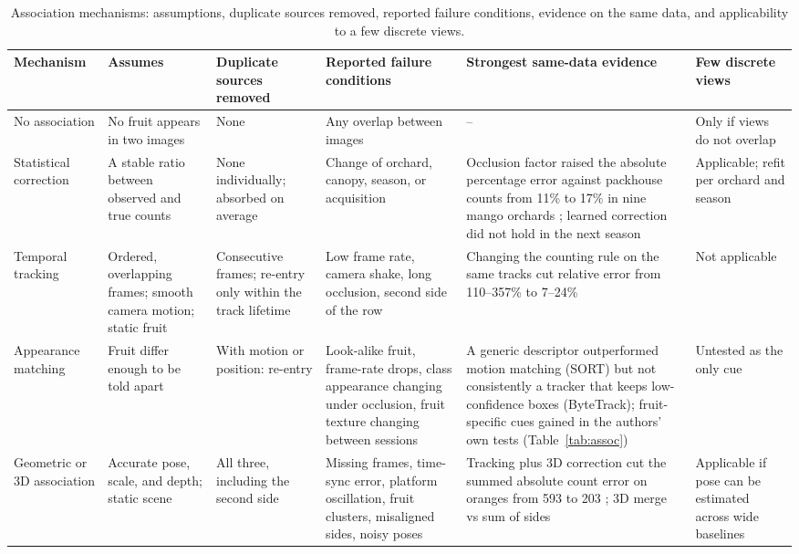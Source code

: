 \begin{table}[!t]
\centering
\caption{Association mechanisms: assumptions, duplicate sources removed, reported failure conditions, evidence on the same data, and applicability to a few discrete views.}\label{tab:mechsyn}
\footnotesize
\begin{tabularx}{\textwidth}{@{}L{2.0cm}L{2.9cm}L{2.2cm}YL{3.0cm}L{2.3cm}@{}}
\toprule
Mechanism & Assumes & Duplicate sources removed & Reported failure conditions & Strongest same-data evidence & Few discrete views\\
\midrule
No association & No fruit appears in two images & None & Any overlap between images & -- & Only if views do not overlap\\
Statistical correction & A stable ratio between observed and true counts & None individually; absorbed on average & Change of orchard, canopy, season, or acquisition \citep{anderson2021estimation,koirala2021attempting,islam2022ground} & Occlusion factor raised the absolute percentage error against packhouse counts from 11\% to 17\% in nine mango orchards \citep{anderson2021estimation}; learned correction did not hold in the next season \citep{koirala2021attempting} & Applicable; refit per orchard and season\\
Temporal tracking & Ordered, overlapping frames; smooth camera motion; static fruit & Consecutive frames; re-entry only within the track lifetime & Low frame rate, camera shake, long occlusion, second side of the row \citep{qi2025assessment,wei2025multi,saraceni2024agrisort,wang2019mango} & Changing the counting rule on the same tracks cut relative error from 110--357\% to 7--24\% \citep{zhou2024advancing} & Not applicable\\
Appearance matching & Fruit differ enough to be told apart & With motion or position: re-entry & Look-alike fruit, frame-rate drops, class appearance changing under occlusion, fruit texture changing between sessions \citep{genemola2023video,qi2025assessment,kirk2021robust,mirbod2021field} & A generic descriptor outperformed motion matching (SORT) but not consistently a tracker that keeps low-confidence boxes (ByteTrack); fruit-specific cues gained in the authors' own tests (Table~\ref{tab:assoc}) & Untested as the only cue\\
Geometric or 3D association & Accurate pose, scale, and depth; static scene & All three, including the second side & Missing frames, time-sync error, platform oscillation, fruit clusters, misaligned sides, noisy poses \citep{stein2016image,genemola2020fruitb,qureshi2023seeing,meyer2025fruitnerf} & Tracking plus 3D correction cut the summed absolute count error on oranges from 593 to 203 \citep{liu2018robust}; 3D merge vs sum of sides \citep{hani2020comparative} & Applicable if pose can be estimated across wide baselines\\

\end{tabularx}
\end{table}
